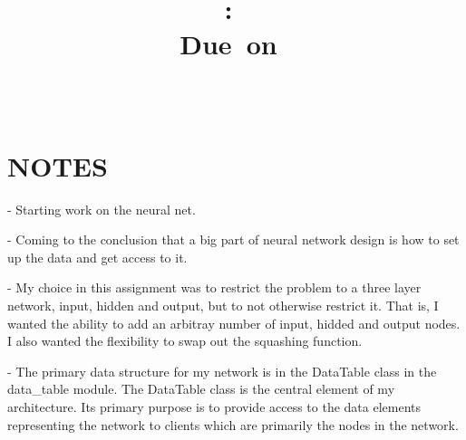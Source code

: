 \documentclass{article}
\title{\vspace{2in}\textmd{\textbf{\hmwkClass:\ \hmwkTitle\ifthenelse{\equal{\hmwkSubTitle}{}}{}{\\\hmwkSubTitle}}}\\\normalsize\vspace{0.1in}\small{Due\ on\ \hmwkDueDate}\\\vspace{0.1in}\large{\textit{\hmwkClassInstructor\ \hmwkClassTime}}\vspace{3in}}
\date{}
\author{\textbf{\hmwkAuthorName}}
\begin{document}
\maketitle

\section{NOTES}
- Starting work on the neural net.

- Coming to the conclusion that a big part of neural network
design is how to set up the data and get access to it.

- My choice in this assignment was to restrict the problem to a
three layer network, input, hidden and output, but to not
otherwise restrict it.  That is, I wanted the ability to add
an arbitray number of input, hidded and output nodes.  I also
wanted the flexibility to swap out the squashing function.

- The primary data structure for my network is in the DataTable
class in the data_table module.  The DataTable class is the central
element of my architecture.  Its primary purpose is to provide
access to the data elements representing the network to clients
which are primarily the nodes in the network.
\end{document}
